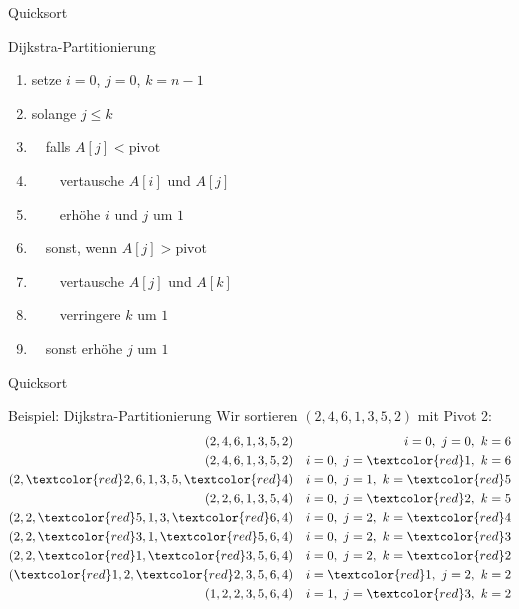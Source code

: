 \documentclass[aspectratio=1610, 11pt]{beamer}
\begin{document}
\begin{frame}{Quicksort}
\begin{exampleblock}{Dijkstra-Partitionierung}
	\begin{enumerate}
		\item setze $i=0$, $j=0$, $k=n-1$
		\item solange $j\leq k$
		\item $\quad$falls $A[j]<\mbox{pivot}$
		\item $\qquad$vertausche $A[i]$ und $A[j]$
		\item $\qquad$erh\"ohe $i$ und $j$ um $1$
		\item $\quad$sonst, wenn $A[j]>\mbox{pivot}$
		\item $\qquad$vertausche $A[j]$ und $A[k]$
		\item $\qquad$verringere $k$ um $1$
		\item $\quad$sonst erh\"ohe $j$ um $1$
	\end{enumerate}
	\end{exampleblock}
\end{frame}

\begin{frame}{Quicksort}
\begin{exampleblock}{Beispiel: Dijkstra-Partitionierung}
		Wir sortieren $(2,4,6,1,3,5,2)$ mit Pivot 2:
			\begin{align*}
				(2,4,6,1,3,5,2)&&i=0,\ j=0,\ k=6\\
				(2,4,6,1,3,5,2)&&i=0,\ j=\textcolor{red}1,\ k=6\\
				(2,\textcolor{red}2,6,1,3,5,\textcolor{red}4)&&i=0,\ j=1,\ k=\textcolor{red}5\\
				(2,2,6,1,3,5,4)&&i=0,\ j=\textcolor{red}2,\ k=5\\
				(2,2,\textcolor{red}5,1,3,\textcolor{red}6,4)&&i=0,\ j=2,\ k=\textcolor{red}4\\
				(2,2,\textcolor{red}3,1,\textcolor{red}5,6,4)&&i=0,\ j=2,\ k=\textcolor{red}3\\
				(2,2,\textcolor{red}1,\textcolor{red}3,5,6,4)&&i=0,\ j=2,\ k=\textcolor{red}2\\
				(\textcolor{red}1,2,\textcolor{red}2,3,5,6,4)&&i=\textcolor{red}1,\ j=2,\ k=2\\
				(1,2,2,3,5,6,4)&&i=1,\ j=\textcolor{red}3,\ k=2
			\end{align*}
	\end{exampleblock}
\end{frame}
\end{document}
